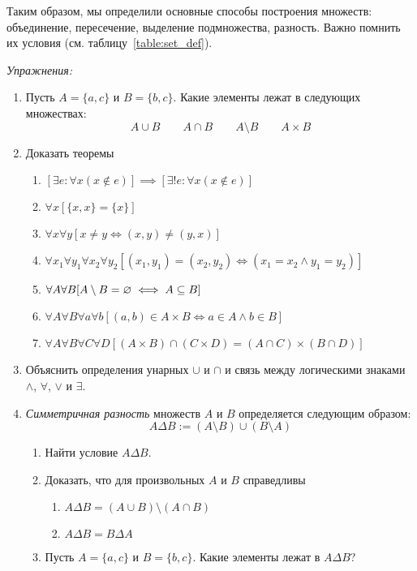 Таким образом, мы определили основные способы построения множеств:
объединение, пересечение, выделение подмножества, разность.
Важно помнить их условия (см. таблицу~\ref{table:set_def}).

\vspace{1em}
{\it Упражнения:}
\begin{enumerate}
	\item{}Пусть $A=\{a,c\}$ и $B=\{b,c\}$. Какие элементы лежат в следующих
	множествах:
	\[
		A\cup B\qquad A\cap B\qquad A\setminus B\qquad
		A\times B
	\]
	\item{}Доказать теоремы
	\begin{enumerate}
		\item{}$[\exists e:\forall x(x\notin e)]\implies
			[\exists!e:\forall x(x\notin e)]$ \label{ex:eset_only}
		\item{}$\forall x[\{x,x\}=\{x\}]$
		\item{}$\forall x\forall y[x\neq y\iff (x,y)\neq (y,x)]$
		\item{}$\forall x_1\forall y_1\forall x_2\forall y_2
			[(x_1,y_1)=(x_2,y_2)\iff (x_1=x_2\land y_1=y_2)]$
		\item{}$\forall A\forall B[A\setminus B=\varnothing\iff A\subseteq B]$
		\item{}$\forall A\forall B\forall a\forall b
				[(a,b)\in A\times B\iff a\in A\land b\in B]$
		\item{}$\forall A\forall B\forall C\forall D
				[(A\times B)\cap (C\times D)=(A\cap C)\times (B\cap D)]$
	\end{enumerate}
	\item{}Объяснить определения унарных $\cup$ и $\cap$
	и связь между логическими знаками $\land$, $\forall$, $\lor$ и $\exists$.
	\item{}{\it Симметричная разность}
	множеств $A$ и $B$ определяется следующим образом:
	\[
		A\Delta B:=(A\setminus B)\cup (B\setminus A)
	\]
	\begin{enumerate}
		\item{}Найти условие $A\Delta B$.
		\item{}Доказать, что для произвольных $A$ и $B$ справедливы
		\begin{enumerate}
			\item{}$A\Delta B=(A\cup B)\setminus (A\cap B)$
			\item{}$A\Delta B=B\Delta A$
		\end{enumerate}
		\item{}Пусть $A=\{a,c\}$ и $B=\{b,c\}$. Какие элементы лежат в $A\Delta B$?
	\end{enumerate}
\end{enumerate}
